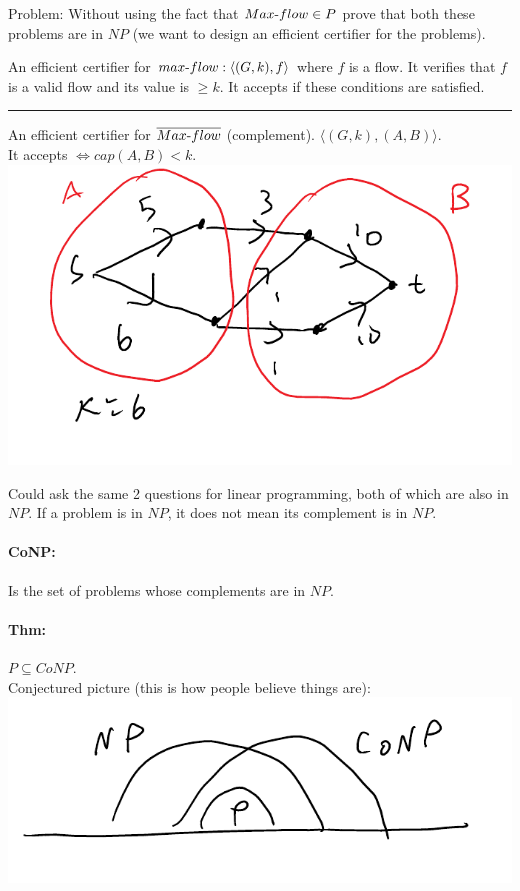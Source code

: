 \documentclass[12 pt]{article}
\begin{document}
          Problem: Without using the fact that $Max\hbox{-}flow \in P$
          prove that both these problems are in $NP$ (we want to
          design an efficient certifier for the problems).

          An efficient certifier for $max\hbox{-}flow: \langle (G,k),
          f \rangle$ where $f$ is a flow. It verifies that $f$ is a
          valid flow and its value is $\geq k$. It accepts if these
          conditions are satisfied.
          \\ \noindent \rule{\textwidth}{0.5pt}
          An efficient certifier for $\overline{Max\hbox{-}flow}$
          (complement). $\langle (G,k), (A,B) \rangle$. \\
          It accepts
          $\iff cap(A,B) < k$.
          \\ \includegraphics[width=.9\textwidth]{i117.pdf}

          Could ask the same 2 questions for linear programming, both
          of which are also in $NP$. If a problem is in $NP$, it does
          not mean its complement is in $NP$.

          \paragraph{CoNP:} Is the set of problems whose complements
          are in $NP$.
          \paragraph{Thm:} $P \subseteq CoNP$.
          \\ Conjectured picture (this is how people believe things are):
          \\ \includegraphics[width=.9\textwidth]{i118.pdf}
\end{document}

